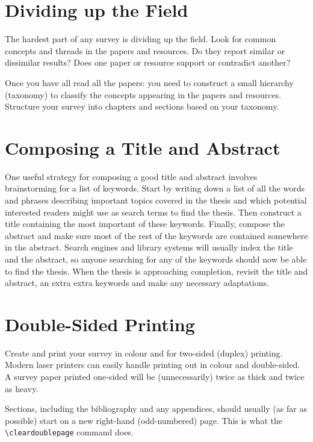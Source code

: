 \section{Dividing up the Field}

The hardest part of any survey is dividing up the field.  Look for
common concepts and threads in the papers and resources. Do they
report similar or dissimilar results? Does one paper or resource
support or contradict another?

Once you have all read all the papers: you need to construct a small
hierarchy (taxonomy) to classify the concepts appearing in the papers
and resources. Structure your survey into chapters and sections based
on your taxonomy.






\section{Composing a Title and Abstract}

One useful strategy for composing a good title and abstract involves
brainstorming for a list of keywords. Start by writing down a list of
all the words and phrases describing important topics covered in the
thesis and which potential interested readers might use as search
terms to find the thesis. Then construct a title containing the most
important of these keywords. Finally, compose the abstract and make
sure most of the rest of the keywords are contained somewhere in the
abstract. Search engines and library systems will usually index the
title and the abstract, so anyone searching for any of the keywords
should now be able to find the thesis. When the thesis is approaching
completion, revisit the title and abstract, an extra extra keywords
and make any necessary adaptations.




\section{Double-Sided Printing}

Create and print your survey in colour and for two-sided (duplex)
printing. Modern laser printers can easily handle printing out in
colour and double-sided. A survey paper printed one-sided will be
(unnecessarily) twice as thick and twice as heavy.

Sections, including the bibliography and any appendices, should
usually (as far as possible) start on a new right-hand (odd-numbered)
page. This is what the \lstinline!\cleardoublepage! command does.







